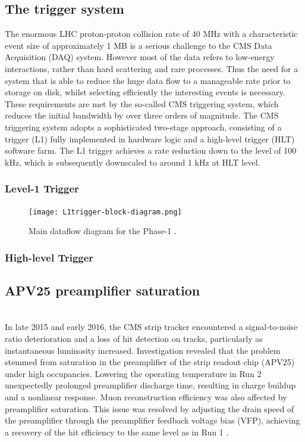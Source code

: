 \subsection{The trigger system}
The enormous LHC proton-proton collision rate of 40 MHz with a characteristic event size of approximately 1 MB
is a serious challenge to the CMS Data Acquisition (DAQ) system.
However most of the data refers to low-energy interactions, rather than hard scattering and rare processes.
Thus the need for a system that is able to reduce the huge data flow to a manageable rate prior to storage on disk,
whilst selecting efficiently the interesting events is necessary.
These requirements are met by the so-called CMS triggering system,
which reduces the initial bandwidth by over three orders of magnitude.
The CMS triggering system adopts a sophisticated two-stage approach,
consisting of a \Lone trigger (L1) fully implemented in hardware logic and a high-level trigger (HLT) software farm.
The L1 trigger achieves a rate reduction down to the level of 100 kHz, which is subsequently downscaled to around 1 kHz at HLT level.

\subsubsection{Level-1 Trigger}

\begin{figure}[thb]
  \centering
  \texttt{[image: L1trigger-block-diagram.png]}
  \caption{Main dataflow diagram for the Phase-1 \Lone \cite{CMS-TDR-12}.}
  \label{fig:L1trigger-block-diagram}
\end{figure}

\subsubsection{High-level Trigger}

\subsection{APV25 preamplifier saturation}
\\
In late 2015 and early 2016, the CMS strip tracker encountered a signal-to-noise ratio deterioration and a loss of hit detection on tracks, particularly as instantaneous luminosity increased.
Investigation revealed that the problem stemmed from saturation in the preamplifier of the strip readout chip (APV25) under high occupancies.
Lowering the operating temperature in Run 2 unexpectedly prolonged preamplifier discharge time, resulting in charge buildup and a nonlinear response.
Muon reconstruction efficiency was also affected by preamplifier saturation.
This issue was resolved by adjusting the drain speed of the preamplifier \cite{Butz:2018dum} through the preamplifier feedback voltage bias (VFP), achieving a recovery of the hit efficiency to the same level as in Run 1 \cite{CMS:2021ime}.

